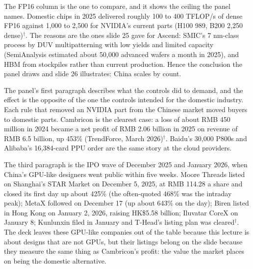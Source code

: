 \documentclass[11pt,letterpaper]{article}
\begin{document}
The FP16 column is the one to compare, and it shows the ceiling the panel names. Domestic chips in 2025 delivered roughly 100 to 400 TFLOP/s of dense FP16 against 1{,}000 to 2{,}500 for NVIDIA's current parts (H100 989, B200 2{,}250 dense)$^\dagger$. The reasons are the ones slide 25 gave for Ascend: SMIC's 7 nm-class process by DUV multipatterning with low yields and limited capacity (SemiAnalysis estimated about 50{,}000 advanced wafers a month in 2025), and HBM from stockpiles rather than current production. Hence the conclusion the panel draws and slide 26 illustrates: China scales by count.

The panel's first paragraph describes what the controls did to demand, and the effect is the opposite of the one the controls intended for the domestic industry. Each rule that removed an NVIDIA part from the Chinese market moved buyers to domestic parts. Cambricon is the clearest case: a loss of about RMB 450 million in 2024 became a net profit of RMB 2.06 billion in 2025 on revenue of RMB 6.5 billion, up 453\% (TrendForce, March 2026)$^\dagger$. Baidu's 30{,}000 P800s and Alibaba's 16{,}384-card PPU order are the same story at the cloud providers.

The third paragraph is the IPO wave of December 2025 and January 2026, when China's GPU-like designers went public within five weeks. Moore Threads listed on Shanghai's STAR Market on December 5, 2025, at RMB 114.28 a share and closed its first day up about 425\% (the often-quoted 468\% was the intraday peak); MetaX followed on December 17 (up about 643\% on the day); Biren listed in Hong Kong on January 2, 2026, raising HK\$5.58 billion; Iluvatar CoreX on January 8; Kunlunxin filed in January and T-Head's listing plan was cleared$^\dagger$. The deck leaves these GPU-like companies out of the table because this lecture is about designs that are not GPUs, but their listings belong on the slide because they measure the same thing as Cambricon's profit: the value the market places on being the domestic alternative.
\end{document}
